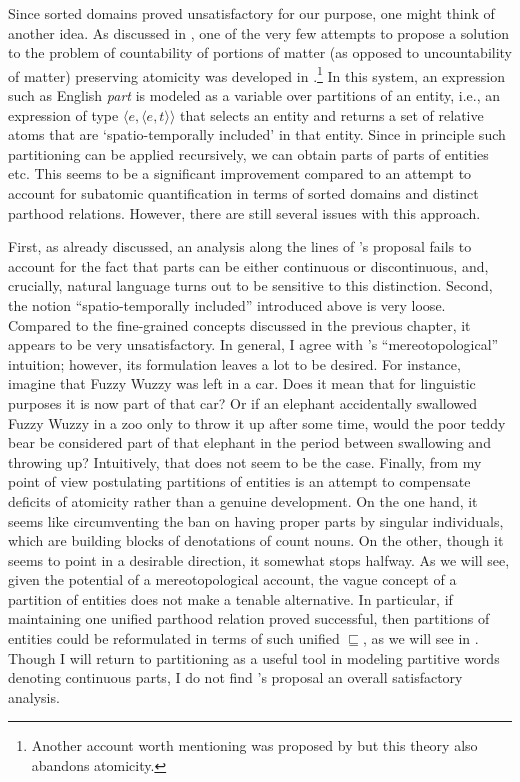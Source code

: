 	Since sorted domains proved unsatisfactory for our purpose, one might think of another idea. As discussed in  , one of the very few attempts to propose a solution to the problem of countability of portions of matter (as opposed to uncountability of matter) preserving atomicity was developed in \citet{chierchia2010mass}.\footnote{Another account worth mentioning was proposed by \citet{landman2016iceberg} but this theory also abandons atomicity.} In this system, an expression such as English \textit{part} is modeled as a variable over partitions of an entity, i.e., an expression of type $\langle e,\langle e,t\rangle\rangle$ that selects an entity and returns a set of relative atoms that are `spatio-temporally included' in that entity. Since in principle such partitioning can be applied recursively, we can obtain parts of parts of entities etc. This seems to be a significant improvement compared to an attempt to account for subatomic quantification in terms of sorted domains and distinct parthood relations. However, there are still several issues with this approach. 
	
	First, as already discussed, an analysis along the lines of \citeauthor{chierchia2010mass}'s proposal fails to account for the fact that parts can be either continuous or discontinuous, and, crucially, natural language turns out to be sensitive to this distinction. Second, the notion ``spatio-temporally included'' introduced above is very loose. Compared to the fine-grained concepts discussed in the previous chapter, it appears to be very unsatisfactory. In general, I agree with \citeauthor{chierchia2010mass}'s ``mereotopological'' intuition; however, its formulation leaves a lot to be desired. For instance, imagine that Fuzzy Wuzzy was left in a car. Does it mean that for linguistic purposes it is now part of that car? Or if an elephant accidentally swallowed Fuzzy Wuzzy in a zoo only to throw it up after some time, would the poor teddy bear be considered part of that elephant in the period between swallowing and throwing up? Intuitively, that does not seem to be the case. Finally, from my point of view postulating partitions of entities is an attempt to compensate deficits of atomicity rather than a genuine development. On the one hand, it seems like circumventing the ban on having proper parts by singular individuals, which are building blocks of denotations of count nouns. On the other, though it seems to point in a desirable direction, it somewhat stops halfway. As we will see, given the potential of a mereotopological account, the vague concept of a partition of entities does not make a tenable alternative. In particular, if maintaining one unified parthood relation proved successful, then partitions of entities could be reformulated in terms of such unified $\sqsubseteq$, as we will see in . Though I will return to partitioning as a useful tool in modeling partitive words denoting continuous parts, I do not find \citeauthor{chierchia2010mass}'s proposal an overall satisfactory analysis.
	
